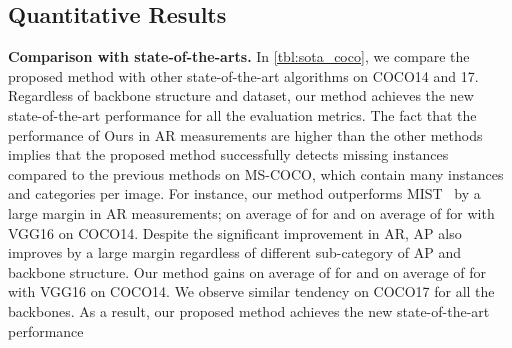 \documentclass[runningheads]{llncs}
\begin{document}
\subsection{Quantitative Results}\noindent\textbf{Comparison with state-of-the-arts.}
In \cref{tbl:sota_coco}, we compare the proposed
method with other state-of-the-art algorithms on COCO14 and 17.
Regardless of backbone structure and dataset, our method achieves the new state-of-the-art performance for all the evaluation metrics.
The fact that the performance of Ours in AR measurements are higher than the other methods implies that the proposed method successfully detects missing instances compared to the previous methods on MS-COCO, which contain many instances
and categories per image.
For instance, our method outperforms MIST~\cite{ren2020instance} by a large margin in AR measurements; on average of  for  
and on average of  for  with VGG16 on COCO14.
Despite the significant improvement in AR, AP also improves by a large margin regardless of different sub-category of AP and backbone structure.
Our method gains on average of  for  and on average of  for  with VGG16 on COCO14.
We observe similar tendency on COCO17 for all the backbones.
As a result, our proposed method achieves the new state-of-the-art performance
\end{document}
